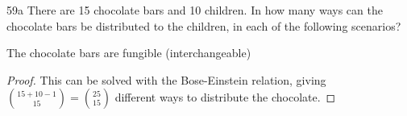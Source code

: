 \begin{exercise}{59a}
    There are 15 chocolate bars and 10 children. In how many ways can the chocolate bars be distributed to the children, in each of the following scenarios?

    The chocolate bars are fungible (interchangeable)
\end{exercise}
\begin{proof}
This can be solved with the Bose-Einstein relation, giving ${15+10-1 \choose 15} = {25 \choose 15}$ different ways to distribute the chocolate.
\end{proof}

